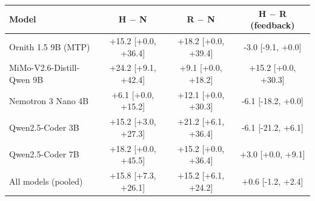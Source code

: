 \begin{tabular}{lccc}\toprule Model & H $-$ N & R $-$ N & H $-$ R (feedback)\\\midrule
Ornith 1.5 9B (MTP) & +15.2 [+0.0, +36.4] & +18.2 [+0.0, +39.4] & -3.0 [-9.1, +0.0] \\
MiMo-V2.6-Distill-Qwen 9B & +24.2 [+9.1, +42.4] & +9.1 [+0.0, +18.2] & +15.2 [+0.0, +30.3] \\
Nemotron 3 Nano 4B & +6.1 [+0.0, +15.2] & +12.1 [+0.0, +30.3] & -6.1 [-18.2, +0.0] \\
Qwen2.5-Coder 3B & +15.2 [+3.0, +27.3] & +21.2 [+6.1, +36.4] & -6.1 [-21.2, +6.1] \\
Qwen2.5-Coder 7B & +18.2 [+0.0, +45.5] & +15.2 [+0.0, +36.4] & +3.0 [+0.0, +9.1] \\
\midrule All models (pooled) & +15.8 [+7.3, +26.1] & +15.2 [+6.1, +24.2] & +0.6 [-1.2, +2.4] \\
\bottomrule\end{tabular}
